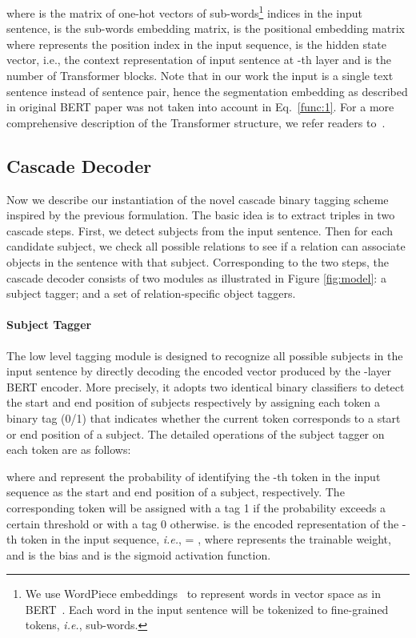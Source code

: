 \documentclass[11pt,a4paper]{article}
\begin{document}
where  is the matrix of one-hot vectors of sub-words\footnote{We use WordPiece embeddings~\citep{wu2016Googles} to represent words in vector space as in BERT~\cite{devlin2019BERT}. Each word in the input sentence will be tokenized to fine-grained tokens, \emph{i.e.}, sub-words.} indices in the input sentence,  is the sub-words embedding matrix,  is the positional embedding matrix where  represents the position index in the input sequence,  is the hidden state vector, i.e., the context representation of input sentence at -th layer and  is the number of Transformer blocks. Note that in our work the input is a single text sentence instead of sentence pair, hence the segmentation embedding as described in original BERT paper was not taken into account in Eq.~\eqref{func:1}. For a more comprehensive description of the Transformer structure, we refer readers to~\citep{vaswani2017Attention}.

\subsection{Cascade Decoder}
Now we describe our instantiation of the novel cascade binary tagging scheme inspired by the previous formulation. The basic idea is to extract triples in two cascade steps. First, we detect subjects from the input sentence. Then for each candidate subject, we check all possible relations to see if a relation can associate objects in the sentence with that subject. Corresponding to the two steps, the cascade decoder consists of two modules as illustrated in Figure \ref{fig:model}: a subject tagger; and a set of relation-specific object taggers.

\paragraph{Subject Tagger}
The low level tagging module is designed to recognize all possible subjects in the input sentence by directly decoding the encoded vector  produced by the -layer BERT encoder. More precisely, it adopts two identical binary classifiers to detect the start and end position of subjects respectively by assigning each token a binary tag (0/1) that indicates whether the current token corresponds to a start or end position of a subject. The detailed operations of the subject tagger on each token are as follows:

where  and  represent the probability of identifying the -th token in the input sequence as the start and end position of a subject, respectively. The corresponding token will be assigned with a tag 1 if the probability exceeds a certain threshold or with a tag 0 otherwise.  is the encoded representation of the -th token in the input sequence, \emph{i.e.},  = , where  represents the trainable weight, and  is the bias and  is the sigmoid activation function.
\end{document}
